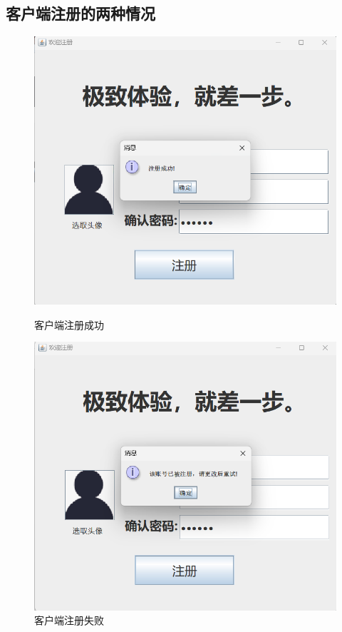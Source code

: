 \documentclass[UTF8,12pt]{article}
\begin{document}
\subsection{客户端注册的两种情况}
\begin{figure}[htbp]
    \centering
    \begin{minipage}{0.4\textwidth}
        \centering
        \includegraphics[width=1.0\textwidth]{img/9.png}
        \caption{客户端注册成功}
    \end{minipage}
    \begin{minipage}{0.4\textwidth}
        \centering
        \includegraphics[width=1.0\textwidth]{img/10.png}
        \caption{客户端注册失败}
    \end{minipage}
\end{figure}
\end{document}

